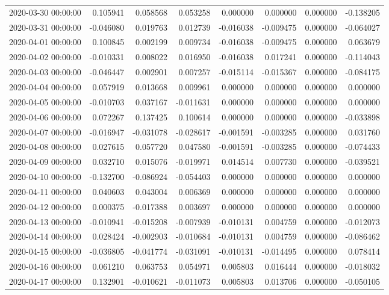 \begin{tabular}{lrrrrrrr}
2020-03-30 00:00:00 & 0.105941 & 0.058568 & 0.053258 & 0.000000 & 0.000000 & 0.000000 & -0.138205 \\
2020-03-31 00:00:00 & -0.046080 & 0.019763 & 0.012739 & -0.016038 & -0.009475 & 0.000000 & -0.064027 \\
2020-04-01 00:00:00 & 0.100845 & 0.002199 & 0.009734 & -0.016038 & -0.009475 & 0.000000 & 0.063679 \\
2020-04-02 00:00:00 & -0.010331 & 0.008022 & 0.016950 & -0.016038 & 0.017241 & 0.000000 & -0.114043 \\
2020-04-03 00:00:00 & -0.046447 & 0.002901 & 0.007257 & -0.015114 & -0.015367 & 0.000000 & -0.084175 \\
2020-04-04 00:00:00 & 0.057919 & 0.013668 & 0.009961 & 0.000000 & 0.000000 & 0.000000 & 0.000000 \\
2020-04-05 00:00:00 & -0.010703 & 0.037167 & -0.011631 & 0.000000 & 0.000000 & 0.000000 & 0.000000 \\
2020-04-06 00:00:00 & 0.072267 & 0.137425 & 0.100614 & 0.000000 & 0.000000 & 0.000000 & -0.033898 \\
2020-04-07 00:00:00 & -0.016947 & -0.031078 & -0.028617 & -0.001591 & -0.003285 & 0.000000 & 0.031760 \\
2020-04-08 00:00:00 & 0.027615 & 0.057720 & 0.047580 & -0.001591 & -0.003285 & 0.000000 & -0.074433 \\
2020-04-09 00:00:00 & 0.032710 & 0.015076 & -0.019971 & 0.014514 & 0.007730 & 0.000000 & -0.039521 \\
2020-04-10 00:00:00 & -0.132700 & -0.086924 & -0.054403 & 0.000000 & 0.000000 & 0.000000 & 0.000000 \\
2020-04-11 00:00:00 & 0.040603 & 0.043004 & 0.006369 & 0.000000 & 0.000000 & 0.000000 & 0.000000 \\
2020-04-12 00:00:00 & 0.000375 & -0.017388 & 0.003697 & 0.000000 & 0.000000 & 0.000000 & 0.000000 \\
2020-04-13 00:00:00 & -0.010941 & -0.015208 & -0.007939 & -0.010131 & 0.004759 & 0.000000 & -0.012073 \\
2020-04-14 00:00:00 & 0.028424 & -0.002903 & -0.010684 & -0.010131 & 0.004759 & 0.000000 & -0.086462 \\
2020-04-15 00:00:00 & -0.036805 & -0.041774 & -0.031091 & -0.010131 & -0.014495 & 0.000000 & 0.078414 \\
2020-04-16 00:00:00 & 0.061210 & 0.063753 & 0.054971 & 0.005803 & 0.016444 & 0.000000 & -0.018032 \\
2020-04-17 00:00:00 & 0.132901 & -0.010621 & -0.011073 & 0.005803 & 0.013706 & 0.000000 & -0.050105 \\

\end{tabular}
